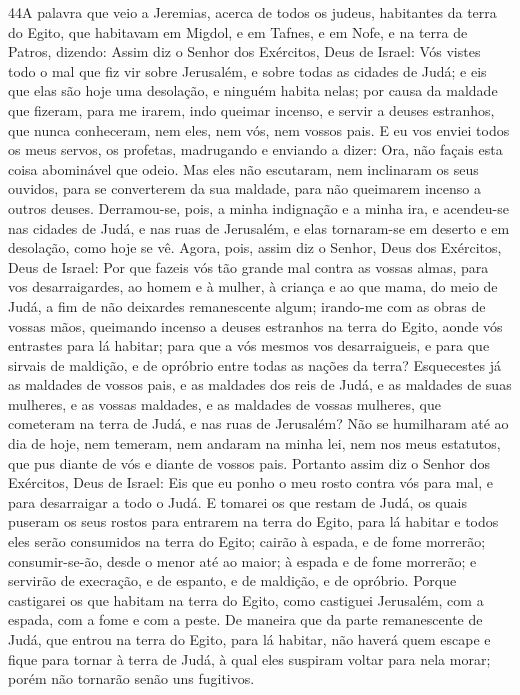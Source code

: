 \lettrine{44} A palavra que veio a Jeremias, acerca de todos
os judeus, habitantes da terra do Egito, que habitavam em Migdol, e
em Tafnes, e em Nofe, e na terra de Patros, dizendo: Assim diz o
Senhor dos Exércitos, Deus de Israel: Vós vistes todo o mal que fiz
vir sobre Jerusalém, e sobre todas as cidades de Judá; e eis que
elas são hoje uma desolação, e ninguém habita nelas; por causa
da maldade que fizeram, para me irarem, indo queimar incenso, e
servir a deuses estranhos, que nunca conheceram, nem eles, nem vós,
nem vossos pais. E eu vos enviei todos os meus servos, os
profetas, madrugando e enviando a dizer: Ora, não façais esta coisa
abominável que odeio. Mas eles não escutaram, nem inclinaram os
seus ouvidos, para se converterem da sua maldade, para não queimarem
incenso a outros deuses. Derramou-se, pois, a minha indignação e
a minha ira, e acendeu-se nas cidades de Judá, e nas ruas de
Jerusalém, e elas tornaram-se em deserto e em desolação, como hoje
se vê. Agora, pois, assim diz o Senhor, Deus dos Exércitos, Deus
de Israel: Por que fazeis vós tão grande mal contra as vossas almas,
para vos desarraigardes, ao homem e à mulher, à criança e ao que
mama, do meio de Judá, a fim de não deixardes remanescente algum;
irando-me com as obras de vossas mãos, queimando incenso a
deuses estranhos na terra do Egito, aonde vós entrastes para lá
habitar; para que a vós mesmos vos desarraigueis, e para que sirvais
de maldição, e de opróbrio entre todas as nações da terra?
Esquecestes já as maldades de vossos pais, e as maldades dos
reis de Judá, e as maldades de suas mulheres, e as vossas maldades,
e as maldades de vossas mulheres, que cometeram na terra de Judá, e
nas ruas de Jerusalém? Não se humilharam até ao dia de hoje,
nem temeram, nem andaram na minha lei, nem nos meus estatutos, que
pus diante de vós e diante de vossos pais. Portanto assim diz
o Senhor dos Exércitos, Deus de Israel: Eis que eu ponho o meu rosto
contra vós para mal, e para desarraigar a todo o Judá. E
tomarei os que restam de Judá, os quais puseram os seus rostos para
entrarem na terra do Egito, para lá habitar e todos eles serão
consumidos na terra do Egito; cairão à espada, e de fome morrerão;
consumir-se-ão, desde o menor até ao maior; à espada e de fome
morrerão; e servirão de execração, e de espanto, e de maldição, e de
opróbrio. Porque castigarei os que habitam na terra do Egito,
como castiguei Jerusalém, com a espada, com a fome e com a peste.
De maneira que da parte remanescente de Judá, que entrou na
terra do Egito, para lá habitar, não haverá quem escape e fique para
tornar à terra de Judá, à qual eles suspiram voltar para nela morar;
porém não tornarão senão uns fugitivos.


